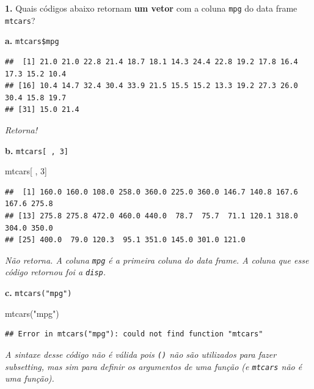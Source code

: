 \documentclass[
]{book}
\newenvironment{Shaded}{\begin{snugshade}}{\end{snugshade}}
\newcommand{\DecValTok}[1]{\textcolor[rgb]{0.00,0.00,0.81}{#1}}
\newcommand{\FunctionTok}[1]{\textcolor[rgb]{0.00,0.00,0.00}{#1}}
\newcommand{\NormalTok}[1]{#1}
\newcommand{\SpecialCharTok}[1]{\textcolor[rgb]{0.00,0.00,0.00}{#1}}
\newcommand{\StringTok}[1]{\textcolor[rgb]{0.31,0.60,0.02}{#1}}
\begin{document}
\textbf{1.} Quais códigos abaixo retornam \textbf{um vetor} com a coluna \texttt{mpg} do data frame \texttt{mtcars}?

\textbf{a.} \texttt{mtcars\$mpg}

\begin{Shaded}
\end{Shaded}

\begin{verbatim}
##  [1] 21.0 21.0 22.8 21.4 18.7 18.1 14.3 24.4 22.8 19.2 17.8 16.4 17.3 15.2 10.4
## [16] 10.4 14.7 32.4 30.4 33.9 21.5 15.5 15.2 13.3 19.2 27.3 26.0 30.4 15.8 19.7
## [31] 15.0 21.4
\end{verbatim}

\emph{Retorna!}

\textbf{b.} \texttt{mtcars{[}\ ,\ 3{]}}

\begin{Shaded}
\begin{Highlighting}[]
\NormalTok{mtcars[ , }\DecValTok{3}\NormalTok{]}
\end{Highlighting}
\end{Shaded}

\begin{verbatim}
##  [1] 160.0 160.0 108.0 258.0 360.0 225.0 360.0 146.7 140.8 167.6 167.6 275.8
## [13] 275.8 275.8 472.0 460.0 440.0  78.7  75.7  71.1 120.1 318.0 304.0 350.0
## [25] 400.0  79.0 120.3  95.1 351.0 145.0 301.0 121.0
\end{verbatim}

\emph{Não retorna. A coluna \texttt{mpg} é a primeira coluna do data frame. A coluna que esse código retornou foi a \texttt{disp}.}

\textbf{c.} \texttt{mtcars("mpg")}

\begin{Shaded}
\begin{Highlighting}[]
\FunctionTok{mtcars}\NormalTok{(}\StringTok{"mpg"}\NormalTok{)}
\end{Highlighting}
\end{Shaded}

\begin{verbatim}
## Error in mtcars("mpg"): could not find function "mtcars"
\end{verbatim}

\emph{A sintaxe desse código não é válida pois \texttt{()} não são utilizados para fazer subsetting, mas sim para definir os argumentos de uma função (e \texttt{mtcars} não é uma função).}
\end{document}
